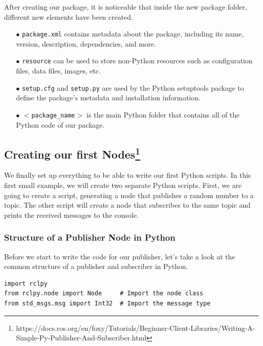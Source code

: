 \documentclass{article}
\begin{document}
\noindent
After creating our package, it is noticeable that inside the new package folder, different new elements have been created.
\begin{enumerate}

\item[$\bullet$] \texttt{package.xml} contains metadata about the package, including its name, version, description, dependencies, and more.

\item[$\bullet$] \texttt{resource} can be used to store non-Python resources such as configuration files, data files, images, etc.

\item[$\bullet$] \texttt{setup.cfg} and \texttt{setup.py} are used by the Python setuptools package to define the package's metadata and installation information.

\item[$\bullet$] \texttt{$<$package\_name$>$} is the main Python folder that contains all of the Python code of our package.
\end{enumerate}

\subsection[Creating our first Nodes]{Creating our first Nodes\footnote{https://docs.ros.org/en/foxy/Tutorials/Beginner-Client-Libraries/Writing-A-Simple-Py-Publisher-And-Subscriber.html}}

 We finally set up everything to be able to write our first Python scripts. In this first small example, we will create two separate Python scripts. First, we are going to create a script, generating a node that publishes a random number to a topic. The other script will create a node that subscribes to the same topic and prints the received messages to the console.


\subsubsection{Structure of a Publisher Node in Python}
\noindent
Before we start to write the code for our publisher, let's take a look at the common structure of a publisher and subscriber in Python. 

\begin{verbatim}
import rclpy
from rclpy.node import Node     # Import the node class
from std_msgs.msg import Int32  # Import the message type
\end{verbatim}
\end{document}
